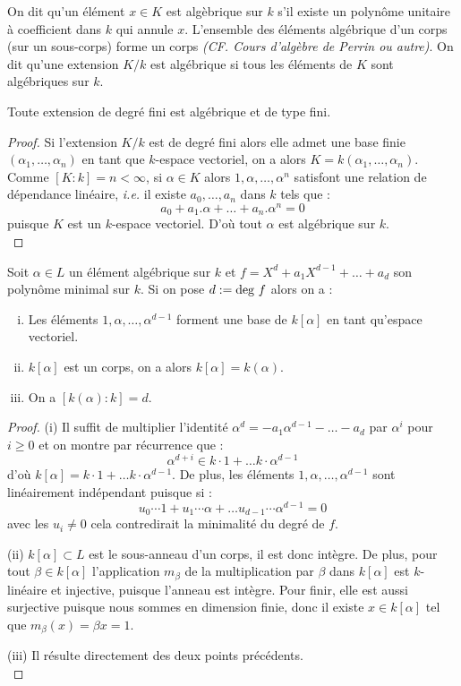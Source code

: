 \documentclass[a4paper]{article} %
\numberwithin{equation}{section}
\begin{document}
On dit qu'un élément $x\in K$ est algèbrique sur $k$ s'il existe un polynôme unitaire à coefficient dans $k$ qui annule $x$. L'ensemble des éléments algébrique d'un corps (sur un sous-corps) forme un corps \textit{(CF. Cours d'algèbre de Perrin ou autre)}. On dit qu'une extension $K/k$ est algébrique si tous les éléments de $K$ sont algébriques sur $k$.

\begin{prop}
Toute extension de degré fini est algébrique et de type fini.
\end{prop}
\begin{proof}
Si l'extension $K/k$ est de degré fini alors elle admet une base finie $(\alpha_1,\dots,\alpha_n)$ en tant que $k$-espace vectoriel, on a alors $K = k(\alpha_1,\dots,\alpha_n)$. Comme $[K:k] = n < \infty$, si $\alpha\in K$ alors $1, \alpha, \dots, \alpha^n$ satisfont une relation de dépendance linéaire, \textit{i.e.} il existe $a_0, \dots, a_n$ dans $k$ tels que :
\[a_0 + a_1.\alpha + \dots + a_n.\alpha^n = 0\]
puisque $K$ est un $k$-espace vectoriel. D'où tout $\alpha$ est algébrique sur $k$.\\
\end{proof}

\begin{prop}
Soit $\alpha\in L$ un élément algébrique sur $k$ et $f = X^d + a_1X^{d-1} + \dots + a_d$ son polynôme minimal sur $k$. Si on pose $d := \textup{deg }f$ alors on a :
\begin{enumerate}[(i)]
\item Les éléments $1, \alpha,\dots,\alpha^{d-1}$ forment une base de $k[\alpha]$ en tant qu'espace vectoriel.
\item $k[\alpha]$ est un corps, on a alors $k[\alpha] = k(\alpha)$.
\item On a $[k(\alpha):k] = d$.
\end{enumerate}
\end{prop}
\begin{proof}
(i) Il suffit de multiplier l'identité $\alpha^d = -a_1\alpha^{d-1} - \dots - a_d$ par $\alpha^i$ pour $i\geq0$ et on montre par récurrence que :
\[\alpha^{d+i} \in k\cdot1 + \dots k\cdot\alpha^{d-1}\]
d'où $k[\alpha] = k\cdot1 + \dots k\cdot\alpha^{d-1}$. De plus, les éléments $1,\alpha,\dots,\alpha^{d-1}$ sont linéairement indépendant puisque si :
\[u_0\cdots1 + u_1\cdots\alpha + \dots u_{d-1}\cdots\alpha^{d-1} = 0\]
avec les $u_i\neq0$ cela contredirait la minimalité du degré de $f$.\par
(ii) $k[\alpha] \subset L$ est le sous-anneau d'un corps, il est donc intègre. De plus, pour tout $\beta\in k[\alpha]$ l'application $m_{\beta}$ de la multiplication par $\beta$ dans $k[\alpha]$ est $k$-linéaire et injective, puisque l'anneau est intègre. Pour finir, elle est aussi surjective puisque nous sommes en dimension finie, donc il existe $x\in k[\alpha]$ tel que $m_{\beta}(x) = \beta x = 1$.\par
(iii) Il résulte directement des deux points précédents.\\
\end{proof}
\end{document}
